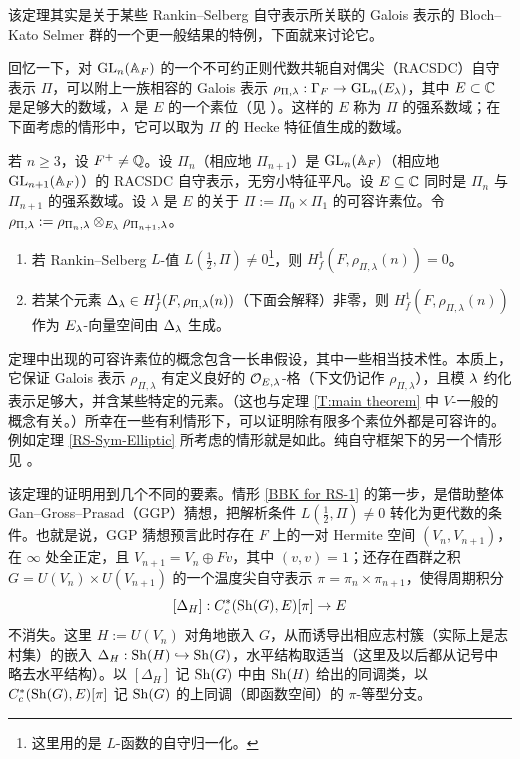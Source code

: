 该定理其实是关于某些 Rankin--Selberg 自守表示所关联的 Galois 表示的 Bloch--Kato Selmer 群的一个更一般结果的特例，下面就来讨论它。

回忆一下，对 ${\operatorname{GL}}_{n}({\mathbb A}_F)$ 的一个不可约正则代数共轭自对偶尖（RACSDC）自守表示 $\Pi$，可以附上一族相容的 Galois 表示 $\rho_{\Pi,{\lambda}}:{\Gamma}_F\to {\operatorname{GL}}_n(E_{\lambda})$，其中 $E\subset {\mathbb C}$ 是足够大的数域，${\lambda}$ 是 $E$ 的一个素位（见 \cite{Chenevier-Harris-Galois-Rep}）。这样的 $E$ 称为 $\Pi$ 的强系数域；在下面考虑的情形中，它可以取为 $\Pi$ 的 Hecke 特征值生成的数域。

\begin{thm}\label{BBK for RS}
若 $n\geq 3$，设 $F^+\neq{\mathbb Q}$。设 $\Pi_n$（相应地 $\Pi_{n+1}$）是 ${\operatorname{GL}}_{n}({\mathbb A}_F)$（相应地 ${\operatorname{GL}}_{n+1}({\mathbb A}_F)$）的 RACSDC 自守表示，无穷小特征平凡。设 $E\subseteq{\mathbb C}$ 同时是 $\Pi_n$ 与 $\Pi_{n+1}$ 的强系数域。设 $\lambda$ 是 $E$ 的关于 $\Pi:=\Pi_0\times \Pi_1$ 的可容许素位。令 $\rho_{\Pi,{\lambda}}:=\rho_{\Pi_n,{\lambda}}\otimes_{E_{\lambda}} \rho_{\Pi_{n+1},{\lambda}}$。
\begin{enumerate}
\item\label{BBK for RS-1} 若 Rankin--Selberg $L$-值 $L(\frac{1}{2},\Pi)\neq 0$\footnote{这里用的是 $L$-函数的自守归一化。}，则 $H^1_f(F,\rho_{\Pi,\lambda}(n))=0$。
\item\label{BBK for RS-2} 若某个元素 $\Delta_{\lambda}\in H^1_f(F,\rho_{\Pi,\lambda}(n))$（下面会解释）非零，则 $H^1_f(F,\rho_{\Pi,\lambda}(n))$ 作为 $E_{\lambda}$-向量空间由 $\Delta_{\lambda}$ 生成。
\end{enumerate}
\end{thm}

定理中出现的可容许素位的概念包含一长串假设，其中一些相当技术性。本质上，它保证 Galois 表示 $\rho_{\Pi,\lambda}$ 有定义良好的 ${\mathcal O}_{E,{\lambda}}$-格（下文仍记作 $\rho_{\Pi,\lambda}$），且模 ${\lambda}$ 约化表示足够大，并含某些特定的元素。（这也与定理 \ref{T:main theorem} 中 $V$-一般的概念有关。）所幸在一些有利情形下，可以证明除有限多个素位外都是可容许的。例如定理 \ref{RS-Sym-Elliptic} 所考虑的情形就是如此。纯自守框架下的另一个情形见 \cite[Thm. 1.1.7]{LTXZZ-BBK}。

该定理的证明用到几个不同的要素。情形 \eqref{BBK for RS-1} 的第一步，是借助整体 Gan--Gross--Prasad（GGP）猜想，把解析条件 $L(\frac{1}{2},\Pi)\neq 0$ 转化为更代数的条件。也就是说，GGP 猜想预言此时存在 $F$ 上的一对 Hermite 空间 $(V_n,V_{n+1})$，在 $\infty$ 处全正定，且 $V_{n+1}=V_n\oplus Fv$，其中 $(v,v)=1$；还存在酉群之积 $G=U(V_n)\times U(V_{n+1})$ 的一个温度尖自守表示 $\pi=\pi_n\times \pi_{n+1}$，使得周期积分
\[
[\Delta_H]: C^*_c({\operatorname{Sh}}(G),E)[\pi]\to E
\]
不消失。这里 $H:=U(V_n)$ 对角地嵌入 $G$，从而诱导出相应志村簇（实际上是志村集）的嵌入 $\Delta_H: {\operatorname{Sh}}(H)\hookrightarrow {\operatorname{Sh}}(G)$，水平结构取适当（这里及以后都从记号中略去水平结构）。以 $[\Delta_H]$ 记 ${\operatorname{Sh}}(G)$ 中由 ${\operatorname{Sh}}(H)$ 给出的同调类，以 $C^*_c({\operatorname{Sh}}(G),E)[\pi]$ 记 ${\operatorname{Sh}}(G)$ 的上同调（即函数空间）的 $\pi$-等型分支。

